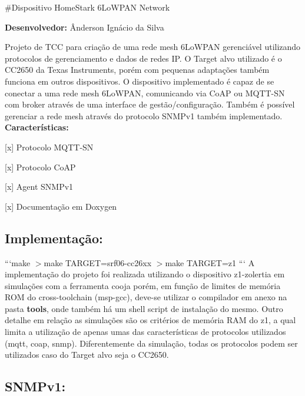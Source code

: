 \#\+Dispositivo Home\+Stark 6\+Lo\+W\+P\+A\+N Network 

{\bfseries Desenvolvedor\+:} Ânderson Ignácio da Silva

Projeto de T\+C\+C para criação de uma rede mesh 6\+Lo\+W\+P\+A\+N gerenciável utilizando protocolos de gerenciamento e dados de redes I\+P. O Target alvo utilizado é o C\+C2650 da Texas Instruments, porém com pequenas adaptações também funciona em outros dispositivos. O dispositivo implementado é capaz de se conectar a uma rede mesh 6\+Lo\+W\+P\+A\+N, comunicando via Co\+A\+P ou M\+Q\+T\+T-\/\+S\+N com broker através de uma interface de gestão/configuração. Também é possível gerenciar a rede mesh através do protocolo S\+N\+M\+Pv1 também implementado.  {\bfseries Características\+:}
\begin{DoxyItemize}
\item \mbox{[}x\mbox{]} Protocolo M\+Q\+T\+T-\/\+S\+N
\item \mbox{[}x\mbox{]} Protocolo Co\+A\+P
\item \mbox{[}x\mbox{]} Agent S\+N\+M\+Pv1
\item \mbox{[}x\mbox{]} Documentação em Doxygen
\end{DoxyItemize}

\subsection*{Implementação\+:}

```make $>$make T\+A\+R\+G\+E\+T=srf06-\/cc26xx $>$make T\+A\+R\+G\+E\+T=z1 ``` A implementação do projeto foi realizada utilizando o dispositivo z1-\/zolertia em simulações com a ferramenta cooja porém, em função de limites de memória R\+O\+M do cross-\/toolchain (msp-\/gcc), deve-\/se utilizar o compilador em anexo na pasta {\bfseries tools}, onde também há um shell script de instalação do mesmo. Outro detalhe em relação as simulações são os critérios de memória R\+A\+M do z1, a qual limita a utilização de apenas umas das características de protocolos utilizados (mqtt, coap, snmp). Diferentemente da simulação, todas os protocolos podem ser utilizados caso do Target alvo seja o C\+C2650.

\subsection*{S\+N\+M\+Pv1\+:}

